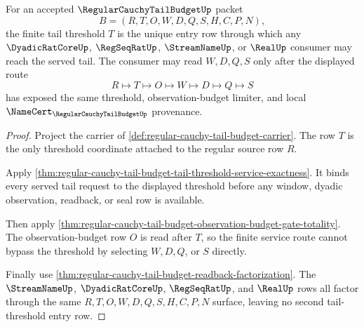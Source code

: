 \begin{theorem}
\label{thm:regular-cauchy-tail-budget-threshold-totality}
For an accepted $\RegularCauchyTailBudgetUp$ packet
$$
B=(R,T,O,W,D,Q,S,H,C,P,N),
$$
the finite tail threshold $T$ is the unique entry row through which any $\DyadicRatCoreUp$, $\RegSeqRatUp$, $\StreamNameUp$, or $\RealUp$ consumer may reach the served tail. The consumer may read $W,D,Q,S$ only after the displayed route
$$
R \longmapsto T \longmapsto O \longmapsto W \longmapsto D \longmapsto Q \longmapsto S
$$
has exposed the same threshold, observation-budget limiter, and local $\NameCert_{\RegularCauchyTailBudgetUp}$ provenance.
\end{theorem}
\begin{proof}
Project the carrier of \autoref{def:regular-cauchy-tail-budget-carrier}. The row $T$ is the only threshold coordinate attached to the regular source row $R$.

Apply \autoref{thm:regular-cauchy-tail-budget-tail-threshold-service-exactness}. It binds every served tail request to the displayed threshold before any window, dyadic observation, readback, or seal row is available.

Then apply \autoref{thm:regular-cauchy-tail-budget-observation-budget-gate-totality}. The observation-budget row $O$ is read after $T$, so the finite service route cannot bypass the threshold by selecting $W,D,Q$, or $S$ directly.

Finally use \autoref{thm:regular-cauchy-tail-budget-readback-factorization}. The $\StreamNameUp$, $\DyadicRatCoreUp$, $\RegSeqRatUp$, and $\RealUp$ rows all factor through the same $R,T,O,W,D,Q,S,H,C,P,N$ surface, leaving no second tail-threshold entry row.
\end{proof}

